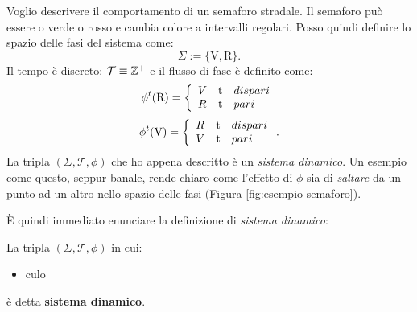 \begin{example}[Semaforo]
    \label{ex:semaforo}
    Voglio descrivere il comportamento di un semaforo stradale.
    Il semaforo può essere o verde o rosso e cambia colore a intervalli regolari.
    Posso quindi definire lo spazio delle fasi del sistema come:
    \begin{equation*}
        \Sigma := \{\text{V}, \text{R} \}.
    \end{equation*}
    Il tempo è discreto: $\mathcal T \equiv \mathbb{Z}^+$ e il flusso di fase è definito come:
    \begin{equation*}
         \phi^t(\text R) = \left\{
         \begin{array}{lrl}
             V &$t$ &dispari\\
             R &$t$ &pari
         \end{array}
         \right.
    \end{equation*}
    \begin{equation*}
        \phi^t(\text V) = \left\{
        \begin{array}{lrl}
            R &$t$ &dispari\\
            V &$t$ &pari
        \end{array}
        \right.
        .
    \end{equation*}
    La tripla $(\Sigma, \mathcal T, \phi)$ che ho appena descritto è un \emph{sistema dinamico}.
    Un esempio come questo, seppur banale, rende chiaro come l'effetto di $\phi$ sia
    di \emph{saltare} da un punto ad un altro nello spazio delle fasi (Figura \ref{fig:esempio-semaforo}).

    \begin{center}
        \label{fig:esempio-semaforo}
    \end{center}
\end{example}

È quindi immediato enunciare la definizione di \emph{sistema dinamico}:

\begin{definition}
    La tripla $(\Sigma, \mathcal T, \phi)$ in cui:
    \begin{itemize}
        \item culo
    \end{itemize}
    è detta \textbf{sistema dinamico}.
\end{definition}

